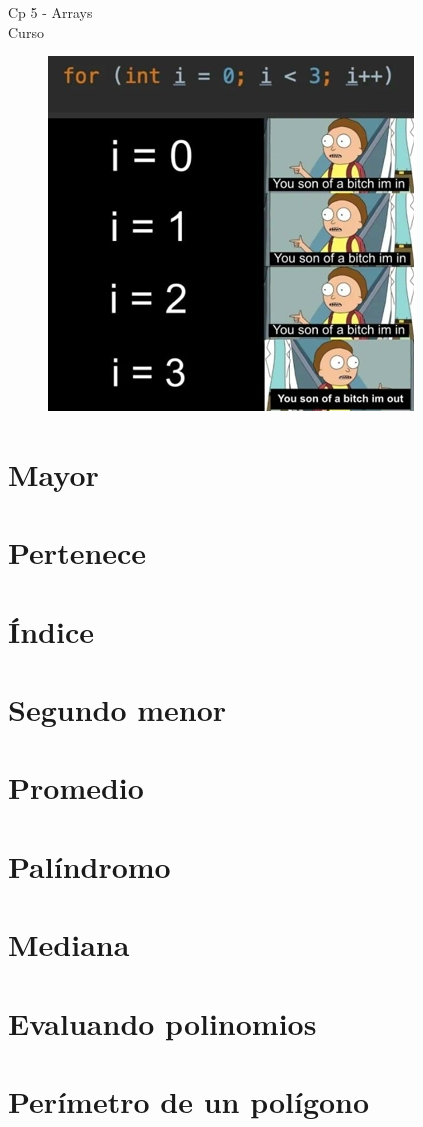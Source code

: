 \begin{center}
    \begin{large}
    Cp 5 - Arrays\\
    Curso \academicyear\\
    \end{large}
    \begin{figure}[h]
    	\centering
    	\includegraphics[width=0.5\linewidth]{cp4/loops.jpg}
    \end{figure}
\end{center}

\section{Mayor}


\section{Pertenece}

 
\section{Índice}

 
\section{Segundo menor}


\section{Promedio}


\section{Palíndromo}


\section{Mediana}


\section{Evaluando polinomios}


\section{Perímetro de un polígono}
